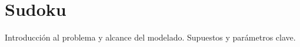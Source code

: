 
\section{Sudoku}\label{sec:01-sudoku}
Introducción al problema y alcance del modelado.
Supuestos y parámetros clave.
